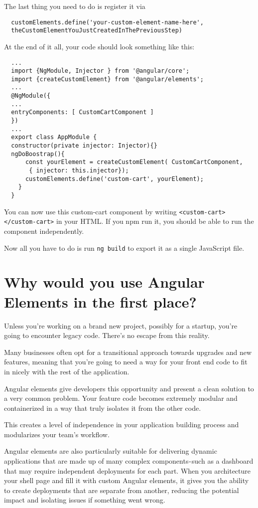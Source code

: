 \begin{enumerate}
  The last thing you need to do is register it via 
  \begin{verbatim}
  customElements.define('your-custom-element-name-here',
  theCustomElementYouJustCreatedInThePreviousStep)
  \end{verbatim}

  At the end of it all, your code should look something like this:

  \begin{verbatim}
  ...
  import {NgModule, Injector } from '@angular/core';
  import {createCustomElement} from '@angular/elements';
  ...
  @NgModule({
  ...
  entryComponents: [ CustomCartComponent ]
  })
  ...
  export class AppModule {
  constructor(private injector: Injector){}
  ngDoBoostrap(){
      const yourElement = createCustomElement( CustomCartComponent,
       { injector: this.injector});
      customElements.define('custom-cart', yourElement);
    }
  }   
  \end{verbatim}

  You can now use this custom-cart component by writing \lstinline{<custom-cart></custom-cart>} in your HTML. If you npm run it, you should be able to run the component independently. 

  Now all you have to do is run \lstinline{ng build} to export it as a single JavaScript file. 
\end{enumerate}

\section{Why would you use Angular Elements in the first place?}

Unless you're working on a brand new project, possibly for a startup, you're going to encounter legacy code. There's no escape from this reality. 

Many businesses often opt for a transitional approach towards upgrades and new features, meaning that you're going to need a way for your front end code to fit in nicely with the rest of the application.

Angular elements give developers this opportunity and present a clean solution to a very common problem. Your feature code becomes extremely modular and containerized in a way that truly isolates it from the other code.

This creates a level of independence in your application building process and modularizes your team's workflow. 

Angular elements are also particularly suitable for delivering dynamic applications that are made up of many complex components - such as a dashboard that may require independent deployments for each part. When you architecture your shell page and fill it with custom Angular elements, it gives you the ability to create deployments that are separate from another, reducing the potential impact and isolating issues if something went wrong. 

